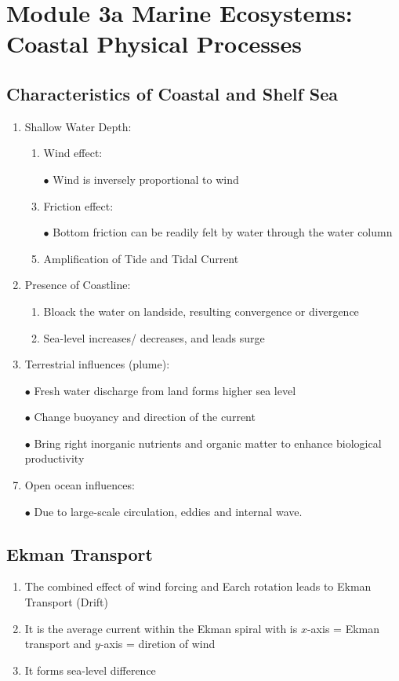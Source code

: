 \documentclass{report}
\begin{document}
\chapter{Module 3a Marine Ecosystems: Coastal Physical Processes}
\section{Characteristics of Coastal and Shelf Sea}
\begin{enumerate}
    \item Shallow Water Depth:
    \begin{enumerate}
        \item Wind effect:
        \item [$\bullet$]Wind is inversely proportional to wind
        \item Friction effect:
        \item [$\bullet$]Bottom friction can be readily felt by water through the water column
        \item Amplification of Tide and Tidal Current
    \end{enumerate}
    \item Presence of Coastline:
    \begin{enumerate}
        \item Bloack the water on landside, resulting convergence or divergence
        \item Sea-level increases/ decreases, and leads surge
    \end{enumerate}
    \item Terrestrial influences (plume):
    \item [$\bullet$]Fresh water discharge from land forms higher sea level
    \item [$\bullet$]Change buoyancy and direction of the current
    \item [$\bullet$]Bring right inorganic nutrients and organic matter to enhance biological productivity 
    \item Open ocean influences:
    \item [$\bullet$]Due to large-scale circulation, eddies and internal wave.
\end{enumerate}


\section{Ekman Transport}
\begin{enumerate}
    \item The combined effect of wind forcing and Earch rotation leads to Ekman Transport (Drift)
    \item It is the average current within the Ekman spiral with is $x$-axis = Ekman transport and $y$-axis = diretion of wind
    \item It forms sea-level difference
\end{enumerate}
\end{document}
